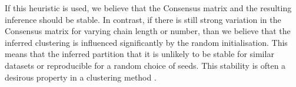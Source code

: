 \documentclass[]{article}
\begin{document}

If this heuristic is used, we believe that the Consensus matrix and the resulting inference should be stable. In contrast, if there is still strong variation in the Consensus matrix for varying chain length or number, than we believe that the inferred clustering is influenced significantly by the random initialisation. This means that the inferred partition that it is unlikely to be stable for similar datasets or reproducible for a random choice of seeds. This stability is often a desirous property in a clustering method \citep{von2005towards, meinshausen2010stability}.

\end{document}
